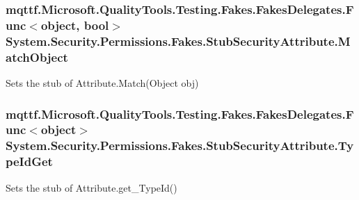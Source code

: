 \hypertarget{class_system_1_1_security_1_1_permissions_1_1_fakes_1_1_stub_security_attribute_a38f5dea3726241c9d877e86e96ea6947}{
\subsubsection[{Match\-Object}]{\setlength{\rightskip}{0pt plus 5cm}mqttf.\-Microsoft.\-Quality\-Tools.\-Testing.\-Fakes.\-Fakes\-Delegates.\-Func$<$object, bool$>$ System.\-Security.\-Permissions.\-Fakes.\-Stub\-Security\-Attribute.\-Match\-Object}}\label{class_system_1_1_security_1_1_permissions_1_1_fakes_1_1_stub_security_attribute_a38f5dea3726241c9d877e86e96ea6947}


Sets the stub of Attribute.\-Match(\-Object obj)

\hypertarget{class_system_1_1_security_1_1_permissions_1_1_fakes_1_1_stub_security_attribute_a5567d893451741f2a01a0cca1b1c2e67}{
\subsubsection[{Type\-Id\-Get}]{\setlength{\rightskip}{0pt plus 5cm}mqttf.\-Microsoft.\-Quality\-Tools.\-Testing.\-Fakes.\-Fakes\-Delegates.\-Func$<$object$>$ System.\-Security.\-Permissions.\-Fakes.\-Stub\-Security\-Attribute.\-Type\-Id\-Get}}\label{class_system_1_1_security_1_1_permissions_1_1_fakes_1_1_stub_security_attribute_a5567d893451741f2a01a0cca1b1c2e67}


Sets the stub of Attribute.\-get\-\_\-\-Type\-Id()



